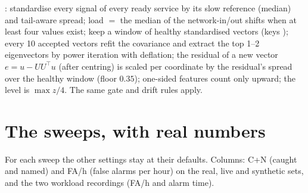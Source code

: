 \begin{techbox}
: standardise every signal of every ready service by its slow reference (median) and tail-aware spread; load $=$ the median of the network-in/out shifts when at least four values exist; keep a window of healthy standardised vectors (keys ); every 10 accepted vectors refit the covariance and extract the top 1--2 eigenvectors by power iteration with deflation; the residual of a new vector $e=u-UU^\top u$ (after centring) is scaled per coordinate by the residual's spread over the healthy window (floor $0.35$); one-sided features count only upward; the level is $\max z/4$. The same gate and drift rules apply.
\end{techbox}

\section{The sweeps, with real numbers}
For each sweep the other settings stay at their defaults. Columns: C+N (caught and named) and FA/h (false alarms per hour) on the real, live and synthetic sets, and the two workload recordings (FA/h and alarm time).

